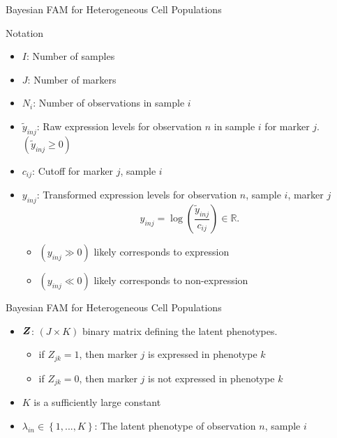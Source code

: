 \documentclass[ignorenonframetext,]{beamer}
\providecommand{\tightlist}{%
  \setlength{\itemsep}{0pt}\setlength{\parskip}{0pt}}
\newcommand{\p}[1]{\left(#1\right)}
\newcommand{\bc}[1]{ \left\{#1\right\} }
\newcommand{\bZ}{\mbox{\boldmath $Z$}}
\begin{document}
\begin{frame}{Bayesian FAM for Heterogeneous Cell Populations}

\begin{block}{Notation}

\begin{itemize}
\tightlist
\item
  \(I\): Number of samples
\item
  \(J\): Number of markers
\item
  \(N_i\): Number of observations in sample \(i\)
\item
  \(\tilde{y}_{inj}\): Raw expression levels for observation \(n\) in
  sample \(i\) for marker \(j\). \((\tilde y_{inj} \ge 0)\)
\item
  \(c_{ij}\): Cutoff for marker \(j\), sample \(i\)
\item
  \(y_{inj}\): Transformed expression levels for observation \(n\),
  sample \(i\), marker \(j\) \[
  y_{inj}=\log\p{\frac{\tilde{y}_{inj}}{c_{ij}}} \in \mathbb{R}.
  \]

  \begin{itemize}
  \tightlist
  \item
    \((y_{inj} \gg 0)\) likely corresponds to expression
  \item
    \((y_{inj} \ll 0)\) likely corresponds to non-expression
  \end{itemize}
\end{itemize}

\end{block}

\end{frame}

\begin{frame}{Bayesian FAM for Heterogeneous Cell Populations}

\begin{itemize}
\item
  \(\bZ\): \((J \times K)\) binary matrix defining the latent
  phenotypes.

  \begin{itemize}
  \item
    if \(Z_{jk} = 1\), then marker \(j\) is expressed in phenotype \(k\)
  \item
    if \(Z_{jk} = 0\), then marker \(j\) is not expressed in phenotype
    \(k\)
  \end{itemize}
\item $K$ is a sufficiently large constant
\item
  \(\lambda_{in} \in \bc{1,...,K}\): The latent phenotype of observation
  \(n\), sample \(i\)
\end{itemize}
\end{frame}
\end{document}
